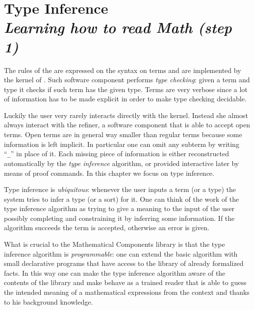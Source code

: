 \chapter[Type Inference]{Type Inference\\[2ex]\Large\itshape Learning \Coq{}
how to read Math (step 1)}

The rules of the \mcbCIC{} are expressed on the syntax on terms and
are implemented by the kernel of \Coq{}.  Such software component
performs \emph{type checking}: given a term and type it checks if such
term has the given type.  Terms are very verbose since a lot of
information has to be made explicit in order to make type checking
decidable.  

Luckily the user very rarely interacts directly with the kernel.
Instead she almost always interact with the refiner, a software
component that is able to accept open terms.  Open terms are in
general way smaller than regular terms because some information is
left implicit.  In particular one can omit any subterm by writing
``\lstinline/_/'' in place of it.
Each missing piece of information is either reconstructed
automatically by the \emph{type inference} algorithm, or provided
interactive later by means of proof commands.  In this chapter we
focus on type inference.

Type inference is \emph{ubiquitous}: whenever the user inputs a term
(or a type) the system tries to infer a type (or
a sort) for it.  One can think of the work of the type inference
algorithm as trying to give a meaning to the input of the
user possibly completing and constraining it by inferring some
information.  If the algorithm succeeds the term is accepted,
otherwise an error is given.

What is crucial to the Mathematical Components library is that the
type inference algorithm is \emph{programmable}: one can extend the
basic algorithm with small declarative programs that have access to
the library of already formalized facts.  In this way one can make the
type inference algorithm aware of the contents of the library and
make \Coq{} behave as a trained reader that is able to guess the
intended meaning of a mathematical expressions from the context
and thanks to his background knowledge.

